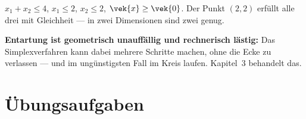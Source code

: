 \begin{warnung}
 $x_1+x_2 \le 4$, $x_1 \le 2$, $x_2 \le 2$, $\vek{x}\ge\vek{0}$. Der Punkt $(2,2)$ erfüllt alle drei mit Gleichheit --- in zwei Dimensionen sind zwei genug.

\begin{center}
\begin{minipage}{0.9\textwidth}
\textbf{Entartung ist geometrisch unauffällig und rechnerisch lästig:} Das Simplexverfahren kann dabei mehrere Schritte machen, ohne die Ecke zu verlassen --- und im ungünstigsten Fall im Kreis laufen. Kapitel~3 behandelt das.
\end{minipage}
\end{center}
\end{warnung}

\section{Übungsaufgaben}


